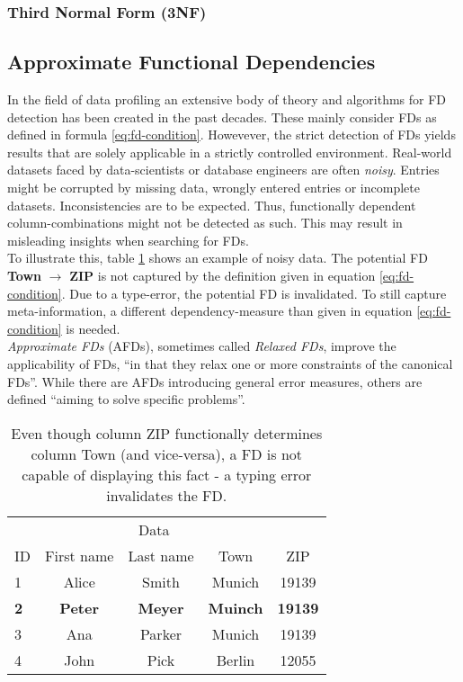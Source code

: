 \subsubsection{Third Normal Form (3NF)}

\subsection{Approximate Functional Dependencies}
In the field of data profiling an extensive body of theory and algorithms for FD detection has been created in the past decades.\cite{PAP15}
These mainly consider FDs as defined in formula \ref{eq:fd-condition}.
Howevever, the strict detection of FDs yields results that are solely applicable in a strictly controlled environment.
Real-world datasets faced by data-scientists or database engineers are often \emph{noisy}.
Entries might be corrupted by missing data, wrongly entered entries or incomplete datasets.
Inconsistencies are to be expected.
Thus, functionally dependent column-combinations might not be detected as such. This may result in misleading insights when searching for FDs. \\

To illustrate this, table \ref{tab:example-afd-necessity} shows an example of noisy data.
The potential FD \textbf{Town} \(\to\) \textbf{ZIP} is not captured by the definition given in equation \ref{eq:fd-condition}.
Due to a type-error, the potential FD is invalidated.
To still capture meta-information, a different dependency-measure than given in equation \ref{eq:fd-condition} is needed. \\

\emph{Approximate FDs} (AFDs), sometimes called \emph{Relaxed FDs}, improve the applicability of FDs, ``in that they relax one or more constraints of the canonical FDs''\cite[p.~1]{CAR16}. While there are AFDs introducing general error measures, others are defined ``aiming to solve specific problems''\cite[p.~1]{CAR16}. \\

\begin{table}[ht]
    \centering
    \begin{tabular}{lcccc}
        \toprule
        & \multicolumn{3}{c}{Data} \\ \cmidrule(lr){2-5}
        ID & First name & Last name & Town & ZIP \\
        \midrule
        1 & Alice & Smith & Munich & 19139 \\
        \textbf{2} & \textbf{Peter}& \textbf{Meyer} &
        \textbf{Muinch} & \textbf{19139} \\
        3 & Ana & Parker & Munich & 19139  \\
        4 & John & Pick & Berlin & 12055 \\
        \bottomrule
    \end{tabular}
    \caption{Even though column ZIP functionally determines column Town (and vice-versa), a FD is not capable of displaying this fact - a typing error invalidates the FD.}
    \label{tab:example-afd-necessity}
\end{table}

